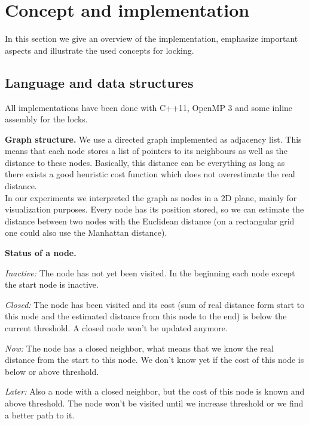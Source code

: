 \documentclass[letterpaper]{article}
\newcommand{\mypar}[1]{{\bf #1.}}
\begin{document}
\section{Concept and implementation}\label{sec:impl}

In this section we give an overview of the implementation, emphasize important aspects and illustrate the used concepts for locking. 

\subsection{Language and data structures}\label{ssec:lang}

All implementations have been done with C++11, OpenMP 3 and some inline assembly for the locks.

\mypar{Graph structure}
We use a directed graph implemented as adjacency list. This means that each node stores a list of pointers to its neighbours as well as the distance to these nodes. Basically, this distance can be everything as long as there exists a good heuristic cost function which does not overestimate the real distance. \\
In our experiments we interpreted the graph as nodes in a 2D plane, mainly for visualization purposes. Every node has its position stored, so we can estimate the distance between two nodes with the Euclidean distance (on a rectangular grid one could also use the Manhattan distance).

\mypar{Status of a node}
\begin{compactitem}
\item \textit{Inactive:} The node has not yet been visited. In the beginning each node except the start node is inactive.
\item \textit{Closed:} The node has been visited and its cost (sum of real distance form start to this node and the estimated distance from this node to the end) is below the current threshold. A closed node won't be updated anymore.
\item \textit{Now:} The node has a closed neighbor, what means that we know the real distance from the start to this node. We don't know yet if the cost of this node is below or above threshold.
\item \textit{Later:} Also a node with a closed neighbor, but the cost of this node is known and above threshold. The node won't be visited until we increase threshold or we find a better path to it.
\end{compactitem}
\end{document}
